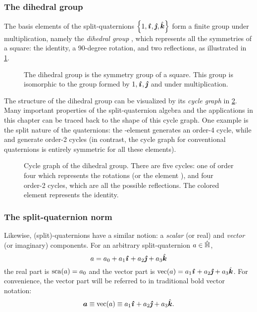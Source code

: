 \subsubsection{The dihedral group} The basis elements of the split-quaternions \(\qty{1, \quati, \quatj, \quatk}\) form a finite group under multiplication, namely the \emph{dihedral group} , which represents all the symmetries of a square: the identity, a 90-degree rotation, and two reflections, as illustrated in \cref{fig:square_symmetry}. \cite{Dummit2004}
\begin{figure}[ht!]
    \centering
    
    \caption{The dihedral group  is the symmetry group of a square. This group is isomorphic to the group formed by \(1, \quati, \quatj\) and \quatk under multiplication.}
    \label{fig:square_symmetry}
\end{figure}

The structure of the dihedral group can be visualized by its \emph{cycle graph} in \cref{fig:cycle_graph}. Many important properties of the split-quaternion algebra and the applications in this chapter can be traced back to the shape of this cycle graph. One example is the split nature of the quaternions: the \quati-element generates an order-4 cycle, while \quatj and \quatk generate order-2 cycles (in contrast, the cycle graph for conventional quaternions is entirely symmetric for all these elements). \cite{Dummit2004}
\begin{figure}[h!]
    \centering
    
    \caption{Cycle graph of the dihedral group. There are five cycles: one of order four which represents the rotations (or the element \quati), and four order-2 cycles, which are all the possible reflections. The colored element represents the identity.}
    \label{fig:cycle_graph}
\end{figure}

\subsubsection{The split-quaternion norm} Likewise, (split)-quaternions have a similar notion: a \emph{scalar} (or real) and \emph{vector} (or imaginary) components. For an arbitrary split-quaternion \(a \in \hat{\mathbb{H}}\), \cite{Jafari2014}
\begin{equation}
     a = \quat{a_0}{a_1}{a_2}{a_3}
\end{equation}
the real part is \(\mathrm{sca}\qty(a) = a_0\) and the vector part is \( \vecpart{a} = \quatvec{a_1}{a_2}{a_3}\). For convenience, the vector part will be referred to in traditional bold vector notation:
\begin{equation}
     \vec{a} \equiv \vecpart{a} \equiv \quatvec{a_1}{a_2}{a_3}.
\end{equation}

